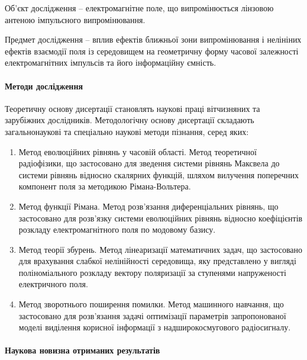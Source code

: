 Об’єкт дослідження -- електромагнітне поле, що випромінюється лінзовою антеною 
імпульсного випромінювання.

Предмет дослідження -- вплив ефектів ближньої зони випромінювання і нелініних 
ефектів взаємодії поля із середовищем на геометричну форму часової залежності
електромагнітних імпульсів та його інформаційну ємність.

\paragraph{Методи дослідження}

Теоретичну основу дисертації становлять наукові праці вітчизняних та 
зарубіжних дослідників. Методологічну основу дисертації складають 
загальнонаукові та спеціально наукові методи пізнання, серед яких:

\begin{enumerate}

\item Метод еволюційних рівнянь у часовій області. Метод теоретичної 
радіофізики, що застосовано для зведення системи рівнянь Максвела до 
системи рівнянь відносно скалярних функцій, шляхом вилучення поперечних 
компонент поля за методикою Рімана-Вольтера.

\item Метод функції Рімана. Метод розв'язання диференціальних рівнянь, що
застосовано для розв'язку системи еволюційних рівнянь відносно коефіцієнтів 
розкладу електромагнітного поля по модовому базису.

\item Метод теорії збурень. Метод лінеаризації математичних задач, що 
застосовано для врахування слабкої нелінійності середовища, яку представлено 
у вигляді поліноміального розкладу вектору поляризації за ступенями 
напруженості електричного поля.

\item Метод зворотнього поширення помилки. Метод машинного навчання,
що застосовано для розв'язання задачі оптимізації параметрів запропонованої 
моделі виділення корисної інформації з надширокосмугового радіосигналу.

\end{enumerate}

\paragraph{Наукова новизна отриманих результатів}

